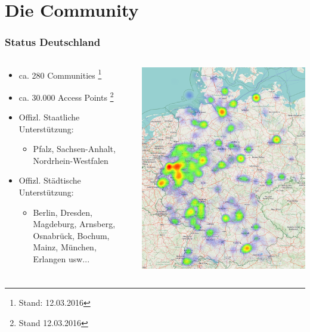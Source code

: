 \section{Die Community}

\begin{frame}
\frametitle{Status Deutschland}
	\begin{columns}[c]   
		\begin{column}[T]{0.5\textwidth}     
			\begin{itemize}
				\item ca. 280 Communities \footnote{Stand: 12.03.2016}
				\item ca. 30.000 Access Points \footnote{Stand 12.03.2016}
				\item Offizl. Staatliche Unterstützung:
				\begin{itemize}
					\item Pfalz, Sachsen-Anhalt, Nordrhein-Westfalen 
				\end{itemize}
				\item Offizl. Städtische Unterstützung:
				\begin{itemize}
					\item Berlin, Dresden, Magdeburg, Arnsberg, Osnabrück, Bochum, Mainz, München, Erlangen usw...
				\end{itemize}
			\end{itemize}
		\end{column}
		\begin{column}[T]{0.4\textwidth}     
			\includegraphics[width=\textwidth]{images/heatmap_germany.png} 
		\end{column}
	\end{columns}		
\end{frame}

